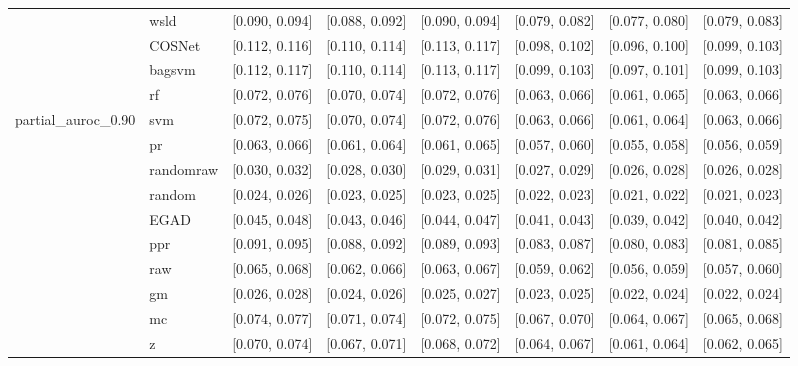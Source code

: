 \begin{table}[H]
{\begin{tabular}{llllllll}
 & wsld & [0.090, 0.094] & [0.088, 0.092] & [0.090, 0.094] & [0.079, 0.082] & [0.077, 0.080] & [0.079, 0.083]\\

 & COSNet & [0.112, 0.116] & [0.110, 0.114] & [0.113, 0.117] & [0.098, 0.102] & [0.096, 0.100] & [0.099, 0.103]\\

 & bagsvm & [0.112, 0.117] & [0.110, 0.114] & [0.113, 0.117] & [0.099, 0.103] & [0.097, 0.101] & [0.099, 0.103]\\

 & rf & [0.072, 0.076] & [0.070, 0.074] & [0.072, 0.076] & [0.063, 0.066] & [0.061, 0.065] & [0.063, 0.066]\\

\multirow{-15}{*}{\raggedright\arraybackslash partial\_auroc\_0.90} & svm & [0.072, 0.075] & [0.070, 0.074] & [0.072, 0.076] & [0.063, 0.066] & [0.061, 0.064] & [0.063, 0.066]\\
\cmidrule{1-8}
 & pr & [0.063, 0.066] & [0.061, 0.064] & [0.061, 0.065] & [0.057, 0.060] & [0.055, 0.058] & [0.056, 0.059]\\

 & randomraw & [0.030, 0.032] & [0.028, 0.030] & [0.029, 0.031] & [0.027, 0.029] & [0.026, 0.028] & [0.026, 0.028]\\

 & random & [0.024, 0.026] & [0.023, 0.025] & [0.023, 0.025] & [0.022, 0.023] & [0.021, 0.022] & [0.021, 0.023]\\

 & EGAD & [0.045, 0.048] & [0.043, 0.046] & [0.044, 0.047] & [0.041, 0.043] & [0.039, 0.042] & [0.040, 0.042]\\

 & ppr & [0.091, 0.095] & [0.088, 0.092] & [0.089, 0.093] & [0.083, 0.087] & [0.080, 0.083] & [0.081, 0.085]\\

 & raw & [0.065, 0.068] & [0.062, 0.066] & [0.063, 0.067] & [0.059, 0.062] & [0.056, 0.059] & [0.057, 0.060]\\

 & gm & [0.026, 0.028] & [0.024, 0.026] & [0.025, 0.027] & [0.023, 0.025] & [0.022, 0.024] & [0.022, 0.024]\\

 & mc & [0.074, 0.077] & [0.071, 0.074] & [0.072, 0.075] & [0.067, 0.070] & [0.064, 0.067] & [0.065, 0.068]\\

 & z & [0.070, 0.074] & [0.067, 0.071] & [0.068, 0.072] & [0.064, 0.067] & [0.061, 0.064] & [0.062, 0.065]\\


\end{tabular}}
\end{table}
